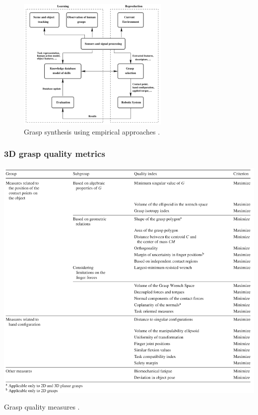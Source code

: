 \documentclass[12pt]{article}
\begin{document}
    \begin{figure}[H]
        \centering
        \includegraphics[width=0.65\textwidth]{sahbani12-empirical_grasp_strategy}
        \caption{Grasp synthesis using empirical approaches \cite{Sahbani2012}.}
        \label{fig:empirical_grasp}
    \end{figure}

    \subsubsection{3D grasp quality metrics}

    \begin{table}[H]
        \includegraphics[width=\textwidth]{roa_suarez-2015-grasp_metrics}
        \caption{Grasp quality measures \cite{Roa2015}.}
        \label{table:grasp_metric}
    \end{table}
\end{document}
